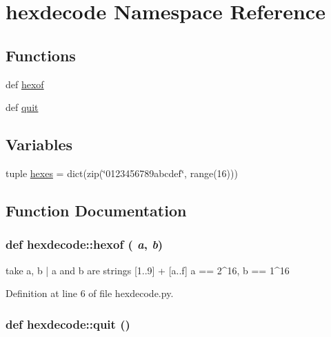 \hypertarget{namespacehexdecode}{
\section{hexdecode Namespace Reference}
\label{namespacehexdecode}
}
\subsection*{Functions}
\begin{DoxyCompactItemize}
\item 
def \hyperlink{namespacehexdecode_a11beab776a4fc79fb648652b49ea9d93}{hexof}
\item 
def \hyperlink{namespacehexdecode_a9324f6932fd88940afe2bbf1c3b5ffd9}{quit}
\end{DoxyCompactItemize}
\subsection*{Variables}
\begin{DoxyCompactItemize}
\item 
tuple \hyperlink{namespacehexdecode_accc606ed3055f10007241f2203f4d79b}{hexes} = dict(zip(\char`\"{}0123456789abcdef\char`\"{}, range(16)))
\end{DoxyCompactItemize}


\subsection{Function Documentation}
\hypertarget{namespacehexdecode_a11beab776a4fc79fb648652b49ea9d93}{
\subsubsection[{hexof}]{\setlength{\rightskip}{0pt plus 5cm}def hexdecode::hexof ( {\em a}, \/   {\em b})}}
\label{namespacehexdecode_a11beab776a4fc79fb648652b49ea9d93}
\begin{DoxyVerb}
take a, b | a and b are strings [1..9] + [a..f]
a == 2^16, b == 1^16
\end{DoxyVerb}
 

Definition at line 6 of file hexdecode.py.

\hypertarget{namespacehexdecode_a9324f6932fd88940afe2bbf1c3b5ffd9}{
\subsubsection[{quit}]{\setlength{\rightskip}{0pt plus 5cm}def hexdecode::quit ()}}
\label{namespacehexdecode_a9324f6932fd88940afe2bbf1c3b5ffd9}


